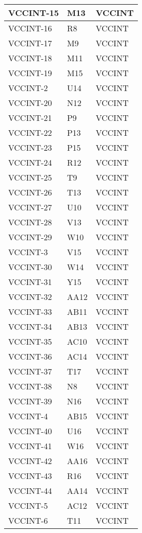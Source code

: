 \begin{footnotesize}
\begin{longtable}{|p{7cm}|p{1cm}|p{5cm}|}
VCCINT-15	&	M13	&	VCCINT	\\ \hline
VCCINT-16	&	R8	&	VCCINT	\\ \hline
VCCINT-17	&	M9	&	VCCINT	\\ \hline
VCCINT-18	&	M11	&	VCCINT	\\ \hline
VCCINT-19	&	M15	&	VCCINT	\\ \hline
VCCINT-2	&	U14	&	VCCINT	\\ \hline
VCCINT-20	&	N12	&	VCCINT	\\ \hline
VCCINT-21	&	P9	&	VCCINT	\\ \hline
VCCINT-22	&	P13	&	VCCINT	\\ \hline
VCCINT-23	&	P15	&	VCCINT	\\ \hline
VCCINT-24	&	R12	&	VCCINT	\\ \hline
VCCINT-25	&	T9	&	VCCINT	\\ \hline
VCCINT-26	&	T13	&	VCCINT	\\ \hline
VCCINT-27	&	U10	&	VCCINT	\\ \hline
VCCINT-28	&	V13	&	VCCINT	\\ \hline
VCCINT-29	&	W10	&	VCCINT	\\ \hline
VCCINT-3	&	V15	&	VCCINT	\\ \hline
VCCINT-30	&	W14	&	VCCINT	\\ \hline
VCCINT-31	&	Y15	&	VCCINT	\\ \hline
VCCINT-32	&	AA12	&	VCCINT	\\ \hline
VCCINT-33	&	AB11	&	VCCINT	\\ \hline
VCCINT-34	&	AB13	&	VCCINT	\\ \hline
VCCINT-35	&	AC10	&	VCCINT	\\ \hline
VCCINT-36	&	AC14	&	VCCINT	\\ \hline
VCCINT-37	&	T17	&	VCCINT	\\ \hline
VCCINT-38	&	N8	&	VCCINT	\\ \hline
VCCINT-39	&	N16	&	VCCINT	\\ \hline
VCCINT-4	&	AB15	&	VCCINT	\\ \hline
VCCINT-40	&	U16	&	VCCINT	\\ \hline
VCCINT-41	&	W16	&	VCCINT	\\ \hline
VCCINT-42	&	AA16	&	VCCINT	\\ \hline
VCCINT-43	&	R16	&	VCCINT	\\ \hline
VCCINT-44	&	AA14	&	VCCINT	\\ \hline
VCCINT-5	&	AC12	&	VCCINT	\\ \hline
VCCINT-6	&	T11	&	VCCINT	\\ \hline

\end{longtable}
\end{footnotesize}
